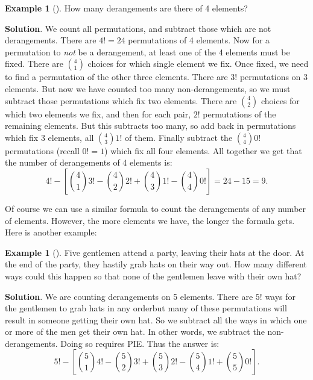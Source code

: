 \documentclass[10pt,]{book}
\theoremstyle{plain}
\theoremstyle{definition}
\theoremstyle{definition}
\newtheorem{example}[theorem]{Example}
\theoremstyle{definition}
\theoremstyle{definition}
\numberwithin{equation}{chapter}
\begin{document}
\begin{example}[]\label{example-14}
\hypertarget{p-977}{}%
How many derangements are there of 4 elements?%
\par\smallskip%
\noindent\textbf{Solution}.\hypertarget{solution-81}{}\quad%
\hypertarget{p-978}{}%
We count all permutations, and subtract those which are not derangements. There are \(4! = 24\) permutations of 4 elements. Now for a permutation to \emph{not} be a derangement, at least one of the 4 elements must be fixed. There are \({4 \choose 1}\) choices for which single element we fix. Once fixed, we need to find a permutation of the other three elements. There are \(3!\) permutations on 3 elements. But now we have counted too many non-derangements, so we must subtract those permutations which fix two elements. There are \({4 \choose 2}\) choices for which two elements we fix, and then for each pair, \(2!\) permutations of the remaining elements. But this subtracts too many, so add back in permutations which fix 3 elements, all \({4 \choose 3}1!\) of them. Finally subtract the \({4 \choose 4}0!\) permutations (recall \(0! = 1\)) which fix all four elements. All together we get that the number of derangements of 4 elements is:%
\begin{equation*}
4! - \left[{4 \choose 1}3! - {4 \choose 2}2! + {4 \choose 3} 1! - {4 \choose 4}0!\right] = 24 - 15 = 9.
\end{equation*}
%
\end{example}
\hypertarget{p-979}{}%
Of course we can use a similar formula to count the derangements of any number of elements. However, the more elements we have, the longer the formula gets. Here is another example:%
\begin{example}[]\label{example-15}
\hypertarget{p-980}{}%
Five gentlemen attend a party, leaving their hats at the door. At the end of the party, they hastily grab hats on their way out. How many different ways could this happen so that none of the gentlemen leave with their own hat?%
\par\smallskip%
\noindent\textbf{Solution}.\hypertarget{solution-82}{}\quad%
\hypertarget{p-981}{}%
We are counting derangements on 5 elements. There are \(5!\) ways for the gentlemen to grab hats in any order\textemdash{}but many of these permutations will result in someone getting their own hat. So we subtract all the ways in which one or more of the men get their own hat. In other words, we subtract the non-derangements. Doing so requires PIE. Thus the answer is:%
\begin{equation*}
5! - \left[{5 \choose 1}4! - {5 \choose 2}3! + {5 \choose 3}2! - {5 \choose 4}1! + {5 \choose 5}0!\right].
\end{equation*}
%
\end{example}
\typeout{************************************************}
\typeout{************************************************}
\end{document}
